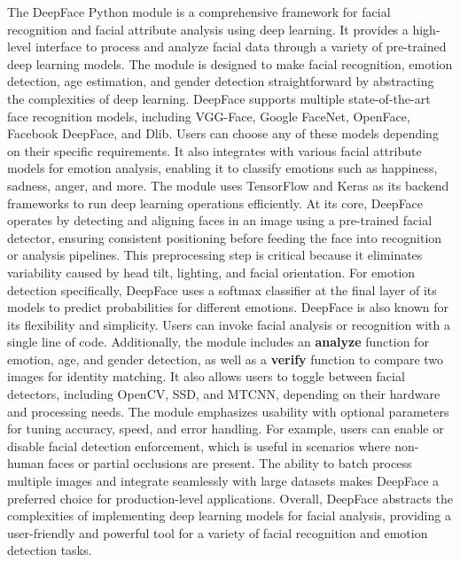 \noindent
The DeepFace Python module is a comprehensive framework for facial recognition and facial attribute analysis using deep learning. It provides a high-level interface to process and analyze facial data through a variety of pre-trained deep learning models. The module is designed to make facial recognition, emotion detection, age estimation, and gender detection straightforward by abstracting the complexities of deep learning. DeepFace supports multiple state-of-the-art face recognition models, including VGG-Face, Google FaceNet, OpenFace, Facebook DeepFace, and Dlib. Users can choose any of these models depending on their specific requirements. It also integrates with various facial attribute models for emotion analysis, enabling it to classify emotions such as happiness, sadness, anger, and more. The module uses TensorFlow and Keras as its backend frameworks to run deep learning operations efficiently. At its core, DeepFace operates by detecting and aligning faces in an image using a pre-trained facial detector, ensuring consistent positioning before feeding the face into recognition or analysis pipelines. This preprocessing step is critical because it eliminates variability caused by head tilt, lighting, and facial orientation. For emotion detection specifically, DeepFace uses a softmax classifier at the final layer of its models to predict probabilities for different emotions. DeepFace is also known for its flexibility and simplicity. Users can invoke facial analysis or recognition with a single line of code. Additionally, the module includes an \textbf{analyze} function for emotion, age, and gender detection, as well as a \textbf{verify} function to compare two images for identity matching. It also allows users to toggle between facial detectors, including OpenCV, SSD, and MTCNN, depending on their hardware and processing needs. The module emphasizes usability with optional parameters for tuning accuracy, speed, and error handling. For example, users can enable or disable facial detection enforcement, which is useful in scenarios where non-human faces or partial occlusions are present. The ability to batch process multiple images and integrate seamlessly with large datasets makes DeepFace a preferred choice for production-level applications. Overall, DeepFace abstracts the complexities of implementing deep learning models for facial analysis, providing a user-friendly and powerful tool for a variety of facial recognition and emotion detection tasks.

\vspace{1em}

